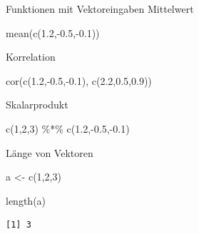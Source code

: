 \documentclass[
  10pt,
  ignorenonframetext,
  aspectratio=169,
]{beamer}
\newenvironment{Shaded}{}{}
\newcommand{\DecValTok}[1]{\textcolor[rgb]{0.25,0.63,0.44}{#1}}
\newcommand{\FloatTok}[1]{\textcolor[rgb]{0.25,0.63,0.44}{#1}}
\newcommand{\FunctionTok}[1]{\textcolor[rgb]{0.02,0.16,0.49}{#1}}
\newcommand{\NormalTok}[1]{#1}
\newcommand{\OtherTok}[1]{\textcolor[rgb]{0.00,0.44,0.13}{#1}}
\newcommand{\SpecialCharTok}[1]{\textcolor[rgb]{0.25,0.44,0.63}{#1}}
\begin{document}
\begin{frame}[fragile]{Funktionen mit Vektoreingaben}
\label{funktionen-mit-vektoreingaben}
Mittelwert

\begin{Shaded}
\begin{Highlighting}[]
\FunctionTok{mean}\NormalTok{(}\FunctionTok{c}\NormalTok{(}\FloatTok{1.2}\NormalTok{,}\SpecialCharTok{{-}}\FloatTok{0.5}\NormalTok{,}\SpecialCharTok{{-}}\FloatTok{0.1}\NormalTok{))}
\end{Highlighting}
\end{Shaded}

Korrelation

\begin{Shaded}
\begin{Highlighting}[]
\FunctionTok{cor}\NormalTok{(}\FunctionTok{c}\NormalTok{(}\FloatTok{1.2}\NormalTok{,}\SpecialCharTok{{-}}\FloatTok{0.5}\NormalTok{,}\SpecialCharTok{{-}}\FloatTok{0.1}\NormalTok{), }\FunctionTok{c}\NormalTok{(}\FloatTok{2.2}\NormalTok{,}\FloatTok{0.5}\NormalTok{,}\FloatTok{0.9}\NormalTok{))}
\end{Highlighting}
\end{Shaded}

Skalarprodukt

\begin{Shaded}
\begin{Highlighting}[]
\FunctionTok{c}\NormalTok{(}\DecValTok{1}\NormalTok{,}\DecValTok{2}\NormalTok{,}\DecValTok{3}\NormalTok{) }\SpecialCharTok{\%*\%} \FunctionTok{c}\NormalTok{(}\FloatTok{1.2}\NormalTok{,}\SpecialCharTok{{-}}\FloatTok{0.5}\NormalTok{,}\SpecialCharTok{{-}}\FloatTok{0.1}\NormalTok{)}
\end{Highlighting}
\end{Shaded}
\end{frame}

\begin{frame}[fragile]{Länge von Vektoren}
\label{luxe4nge-von-vektoren}
\begin{Shaded}
\begin{Highlighting}[]
\NormalTok{a }\OtherTok{\textless{}{-}} \FunctionTok{c}\NormalTok{(}\DecValTok{1}\NormalTok{,}\DecValTok{2}\NormalTok{,}\DecValTok{3}\NormalTok{)}

\FunctionTok{length}\NormalTok{(a)}
\end{Highlighting}
\end{Shaded}

\begin{verbatim}
[1] 3
\end{verbatim}
\end{frame}
\end{document}
